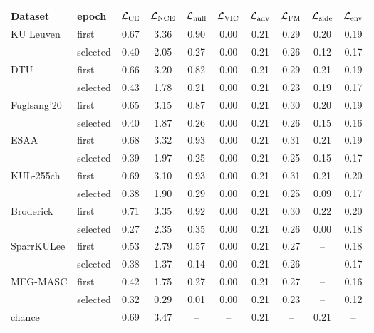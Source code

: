 \begin{tabular}{llcccccccc}\toprule
Dataset & epoch & $\mathcal L_{\rm CE}$ & $\mathcal L_{\rm NCE}$ & $\mathcal L_{\rm null}$ & $\mathcal L_{\rm VIC}$ & $\mathcal L_{\rm adv}$ & $\mathcal L_{\rm FM}$ & $\mathcal L_{\rm side}$ & $\mathcal L_{\rm env}$ \\\midrule
KU Leuven & first & 0.67 & 3.36 & 0.90 & 0.00 & 0.21 & 0.29 & 0.20 & 0.19 \\
 & selected & 0.40 & 2.05 & 0.27 & 0.00 & 0.21 & 0.26 & 0.12 & 0.17 \\
DTU & first & 0.66 & 3.20 & 0.82 & 0.00 & 0.21 & 0.29 & 0.21 & 0.19 \\
 & selected & 0.43 & 1.78 & 0.21 & 0.00 & 0.21 & 0.23 & 0.19 & 0.17 \\
Fuglsang'20 & first & 0.65 & 3.15 & 0.87 & 0.00 & 0.21 & 0.30 & 0.20 & 0.19 \\
 & selected & 0.40 & 1.87 & 0.26 & 0.00 & 0.21 & 0.26 & 0.15 & 0.16 \\
ESAA & first & 0.68 & 3.32 & 0.93 & 0.00 & 0.21 & 0.31 & 0.21 & 0.19 \\
 & selected & 0.39 & 1.97 & 0.25 & 0.00 & 0.21 & 0.25 & 0.15 & 0.17 \\
KUL-255ch & first & 0.69 & 3.10 & 0.93 & 0.00 & 0.21 & 0.31 & 0.21 & 0.20 \\
 & selected & 0.38 & 1.90 & 0.29 & 0.00 & 0.21 & 0.25 & 0.09 & 0.17 \\
Broderick & first & 0.71 & 3.35 & 0.92 & 0.00 & 0.21 & 0.30 & 0.22 & 0.20 \\
 & selected & 0.27 & 2.35 & 0.35 & 0.00 & 0.21 & 0.26 & 0.00 & 0.18 \\
SparrKULee & first & 0.53 & 2.79 & 0.57 & 0.00 & 0.21 & 0.27 & -- & 0.18 \\
 & selected & 0.38 & 1.37 & 0.14 & 0.00 & 0.21 & 0.26 & -- & 0.17 \\
MEG-MASC & first & 0.42 & 1.75 & 0.27 & 0.00 & 0.21 & 0.27 & -- & 0.16 \\
 & selected & 0.32 & 0.29 & 0.01 & 0.00 & 0.21 & 0.23 & -- & 0.12 \\
\midrule
chance & & 0.69 & 3.47 & -- & -- & 0.21 & -- & 0.21 & -- \\
\bottomrule\end{tabular}
